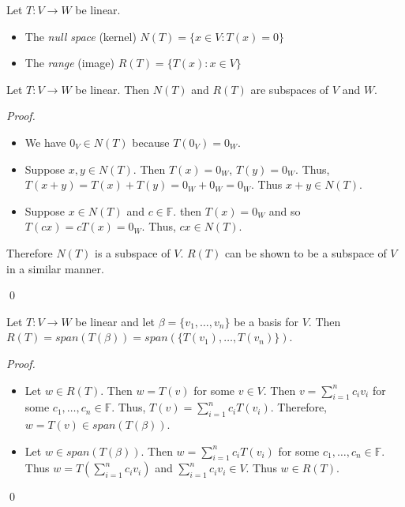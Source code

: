 \documentclass[12pt]{article}
\newenvironment{theorem}[2][Theorem]{\begin{trivlist}
\item[\hskip \labelsep {\bfseries #1}\hskip \labelsep {\bfseries #2.}]}{\end{trivlist}}
\newenvironment{definition}[2][Definition]{\begin{trivlist}
\item[\hskip \labelsep {\bfseries #1}\hskip \labelsep {\bfseries #2}]}{\end{trivlist}}
\newenvironment{sol}
    {\emph{Proof.}
    }
    {
    \qed
    }
\begin{document}
\begin{definition}{2}
Let $T : V \to W$ be linear.

\begin{itemize}
    \item The \textit{null space} (kernel) $N(T) = \{x \in V : T(x) = 0\}$
    \item The \textit{range} (image) $R(T) = \{T(x) : x \in V\}$
\end{itemize}
\end{definition}

\begin{theorem}{2.1}
Let $T : V \to W$ be linear. Then $N(T)$ and $R(T)$ are subspaces of $V$ and $W$.
\end{theorem}

\begin{sol}
\begin{itemize}
    \item[(1)] We have $0_V \in N(T)$ because $T(0_V) = 0_W$.
    
    \item[(2)] Suppose $x,y \in N(T)$. Then $T(x) = 0_W$, $T(y) = 0_W$. Thus, $T(x + y) = T(x) + T(y) = 0_W + 0_W = 0_W$. Thus $x + y \in N(T)$.
    
    \item[(3)] Suppose $x \in N(T)$ and $c \in \mathbb{F}$. then $T(x) = 0_W$ and so $T(cx) = cT(x) = 0_W$. Thus, $cx \in N(T)$.
\end{itemize}

Therefore $N(T)$ is a subspace of $V$. $R(T)$ can be shown to be a subspace of $V$ in a similar manner.
\end{sol}

\begin{theorem}{2.2}
Let $T : V \to W$ be linear and let $\beta = \{v_1, \dots, v_n\}$ be a basis for $V$. Then $R(T) = span(T(\beta)) = span(\{T(v_1), \dots, T(v_n)\})$.
\end{theorem}

\begin{sol}
\begin{itemize}
    \item[(1)] Let $w \in R(T)$. Then $w = T(v)$ for some $v \in V$. Then $v = \sum_{i = 1}^n c_iv_i$ for some $c_1, \dots, c_n \in \mathbb{F}$. Thus, $T(v) = \sum_{i = 1}^n c_iT(v_i)$. Therefore, $w = T(v) \in span(T(\beta))$.
    
    \item[(2)] Let $w \in span(T(\beta))$. Then $w = \sum_{i = 1}^nc_iT(v_i)$ for some $c_1, \dots, c_n \in \mathbb{F}$. Thus $w = T \left( \sum_{i = 1}^nc_iv_i \right)$ and $\sum_{i = 1}^nc_iv_i \in V$. Thus $w \in R(T)$.
\end{itemize}
\end{sol}
\end{document}
